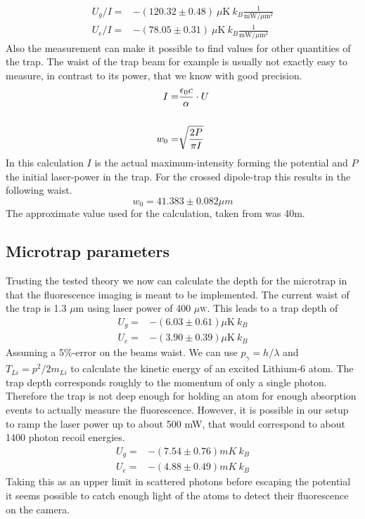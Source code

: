 \begin{align}
U_g/I=&-(120.32\pm 0.48)\ \mu\mathrm{K}\ k_B\frac{1}{\mathrm{mW}/\mu \mathrm{m}^2}\\
U_e/I=&-(78.05\pm 0.31)\ \mu\mathrm{K}\ k_B\frac{1}{\mathrm{mW}/\mu \mathrm{m}^2}
\end{align}
Also the measurement can make it possible to find values for other quantities of the trap. The waist of the trap beam for example is usually not exactly easy to measure, in contrast to its power, that we know with good precision.
\begin{align}
I=&\frac{\epsilon_0 c}{\alpha}\cdot U\\\notag\\
w_0=&\sqrt{\frac{2P}{\pi I}}
\end{align}
In this calculation $I$ is the actual maximum-intensity forming the potential and $P$ the initial laser-power in the trap. For the crossed dipole-trap this results in the following waist.
\begin{equation}
w_0=41.383\pm 0.082\unit{\mu m}
\end{equation}
The approximate value used for the calculation, taken from \cite{lompe} was 40\mu m.

\subsection{Microtrap parameters}

Trusting the tested theory we now can calculate the depth for the microtrap in that the fluorescence imaging is meant to be implemented. The current waist of the trap is 1.3 $\mu$m using laser power of 400 $\mu$\textsc{w}. This leads to a trap depth of
\begin{align}
U_g=&-(6.03\pm 0.61)\mu\mathrm{K}\ k_B\\
U_e=&-(3.90\pm 0.39)\mu\mathrm{K}\ k_B
\end{align}
Assuming a 5\%-error on the beams waist. We can use $p_\gamma=h/\lambda$ and $T_{Li}=p^2/2m_{Li}$ to calculate the kinetic energy of an excited Lithium-6 atom. The trap depth corresponds roughly to the momentum of only a single photon. Therefore the trap is not deep enough for holding an atom for enough absorption events to actually measure the fluorescence. However, it is possible in our setup to ramp the laser power up to about 500 mW, that would correspond to about 1400 photon recoil energies.
\begin{align}
U_g=&-(7.54\pm 0.76)\unit{mK}\ k_B\\
U_e=&-(4.88\pm 0.49)\unit{mK}\ k_B
\end{align}
Taking this as an upper limit in scattered photons before escaping the potential it seems possible to catch enough light of the atoms to detect their fluorescence on the camera. 

